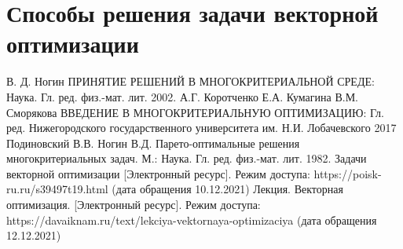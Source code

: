 \documentclass[12pt,a4paper]{report}
\begin{document}
\section{Способы решения задачи векторной оптимизации}
\renewcommand\bibname{Список литературы}
\makeatletter %
\def\@biblabel#1{#1. }
\makeatother
\begin{thebibliography}{2}
	\bibitem{} В. Д. Ногин ПРИНЯТИЕ РЕШЕНИЙ В МНОГОКРИТЕРИАЛЬНОЙ СРЕДЕ: Наука. Гл. ред. физ.-мат. лит. 2002.
    \bibitem{} А.Г. Коротченко Е.А. Кумагина В.М. Сморякова ВВЕДЕНИЕ В МНОГОКРИТЕРИАЛЬНУЮ ОПТИМИЗАЦИЮ: Гл. ред. Нижегородского государственного университета
им. Н.И. Лобачевского 2017
	\bibitem{} Подиновский В.В. Ногин В.Д. Парето-оптимальные решения многокритериальных задач. М.: Наука. Гл. ред. физ.-мат. лит. 1982.
	\bibitem{} Задачи векторной оптимизации [Электронный ресурс]. Режим доступа: https://poisk-ru.ru/s39497t19.html (дата обращения 10.12.2021)
	\bibitem{} Лекция. Векторная оптимизация. [Электронный ресурс]. Режим доступа: https://davaiknam.ru/text/lekciya-vektornaya-optimizaciya (дата обращения 12.12.2021)
\end{thebibliography}
\end{document}
